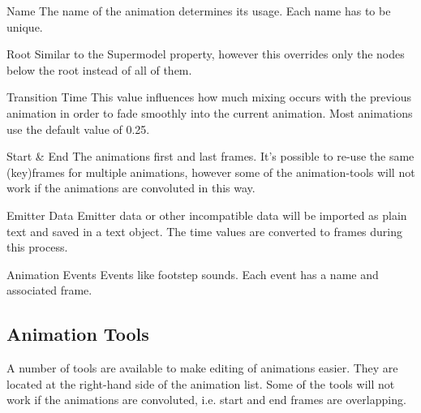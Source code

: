 \begin{propertyAurora}{Name}
    The name of the animation determines its usage. Each name has to be unique.
\end{propertyAurora}

\begin{propertyAurora}{Root}
    Similar to the Supermodel property, however this overrides only the 
    nodes below the root instead of all of them.
\end{propertyAurora}

\begin{propertyAurora}{Transition Time}
    This value influences how much mixing occurs with the previous animation in order to 
    fade smoothly into the current animation. Most animations use the default value of 0.25.
\end{propertyAurora}

\begin{propertyAurora}{Start \& End}
    The animations first and last frames. It's possible to re-use the same (key)frames for 
    multiple animations, however some of the animation-tools will not work if the animations are 
    convoluted in this way.
\end{propertyAurora}

\begin{propertyAurora}{Emitter Data}
    Emitter data or other incompatible data will be imported as plain text and saved in a text object. The
    time values are converted to frames during this process.
\end{propertyAurora}

\begin{propertyAurora}{Animation Events}
    Events like footstep sounds. Each event has a name and associated frame.
\end{propertyAurora}

\subsection{Animation Tools}
A number of tools are available to make editing of animations easier. They are located at the 
right-hand side of the animation list. Some of the tools will not work if the 
animations are convoluted, i.e. start and end frames are overlapping.\\

